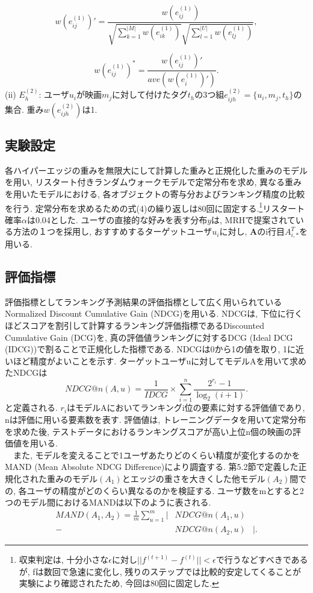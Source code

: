 \documentclass[a4j,11pt]{jarticle}           %
\begin{document}
	\begin{equation}
	w(e_{ij}^{(1)})'=\frac{w(e_{ij}^{(1)})}{\sqrt{\sum_{k=1}^{|M|}w(e_{ik}^{(1)})}\sqrt{\sum_{l=1}^{|U|}w(e_{lj}^{(1)})}},
	\end{equation}
	
	
	\begin{equation}
	w(e_{ij}^{(1)})^*=\frac{w(e_{ij}^{(1)})'}{ave(w(e_i^{(1)})')}.
	\end{equation}
	(ii) $E_h^{(2)}$: ユーザ$u_i$が映画$m_j$に対して付けたタグ$t_h$の3つ組$e^{(2)}_{ijh}=\{u_i,m_j,t_h\}$の集合. 重み$w(e_{ijh}^{(2)})$は1. 
	\subsection{実験設定}
	各ハイパーエッジの重みを無限大にして計算した重みと正規化した重みのモデルを用い, リスタート付きランダムウォークモデルで定常分布を求め, 異なる重みを用いたモデルにおける, 各オブジェクトの寄与分およびランキング精度の比較を行う. 定常分布を求めるための式(4)の繰り返しは80回に固定する.\footnote{収束判定は, 十分小さな$\epsilon$に対し$||f^{(t+1)}−f^{(t)} || < \epsilon$で行うなどすべきであるが, fは数回で急速に変化し, 残りのステップでは比較的安定してくることが実験により確認されたため, 今回は80回に固定した. }リスタート確率$\alpha$は0.04とした. ユーザの直接的な好みを表す分布$y$は, MRH\cite{MRH}で提案されている方法の１つを採用し, おすすめするターゲットユーザ$u_i$に対し, \textbf{A}のi行目$A_{i,*}^T$を用いる.
	\subsection{評価指標}
	評価指標としてランキング予測結果の評価指標として広く用いられているNormalized Discount Cumulative Gain (NDCG)を用いる. NDCGは, 下位に行くほどスコアを割引して計算するランキング評価指標であるDiscounted Cumulative Gain (DCG)を, 真の評価値ランキングに対するDCG (Ideal DCG (IDCG))で割ることで正規化した指標である. NDCGは0から1の値を取り, 1に近いほど精度がよいことを示す. ターゲットユーザuに対してモデルAを用いて求めたNDCGは
	\begin{equation}
	NDCG@n(A,u)=\frac{1}{IDCG}\times\sum_{i=1}^n\frac{2^{r_i}-1}{\log_2(i+1)}.
	\end{equation}
	と定義される. $r_i$はモデルAにおいてランキングi位の要素に対する評価値であり, nは評価に用いる要素数を表す. 評価値は, トレーニングデータを用いて定常分布を求めた後, テストデータにおけるランキングスコアが高い上位n個の映画の評価値を用いる.　
	\\　また, モデルを変えることで1ユーザあたりどのくらい精度が変化するのかをMAND (Mean Absolute NDCG Difference)により調査する. 
	第5.2節で定義した正規化された重みのモデル$(A_1)$とエッジの重さを大きくした他モデル$(A_2)$間での, 各ユーザの精度がどのくらい異なるのかを検証する. 
	ユーザ数をmとすると2つのモデル間におけるMANDは以下のように表される. 
	\begin{eqnarray}
	MAND(A_1,A_2)=\frac{1}{m}\sum_{u=1}^m|&NDCG@n(A_1,u)&　\nonumber\\-&NDCG@n(A_2,u)&|.
	\end{eqnarray}
	
\end{document}
